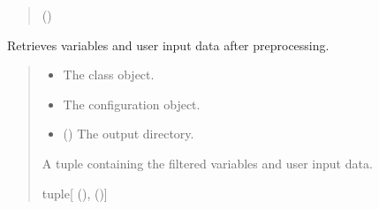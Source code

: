 \documentclass[a4paper,11pt,english,openany]{sphinxmanual}
\begin{document}
\begin{fulllineitems}
\begin{fulllineitems}
\begin{quote}
\begin{description}
\begin{description}
\end{description}


\sphinxAtStartPar
{\hyperref[\detokenize{api/spyice.parameters.user_input:src.spyice.parameters.user_input.UserInput}]{}} ()

\end{description}\end{quote}

\end{fulllineitems}


\begin{fulllineitems}
\label{\detokenize{api/spyice.preprocess.pre_process:src.spyice.preprocess.pre_process.PreProcess.get_variables}}
\pysigstartsignatures
\pysiglinewithargsret
{}
{\sphinxparamcomma {}}
{}
\pysigstopsignatures
\sphinxAtStartPar
Retrieves variables and user input data after preprocessing.
\begin{quote}\begin{description}
\begin{itemize}
\item {} 
\sphinxAtStartPar
{} \textendash{} The class object.

\item {} 
\sphinxAtStartPar
{} \textendash{} The configuration object.

\item {} 
\sphinxAtStartPar
{} () \textendash{} The output directory.

\end{itemize}

\sphinxAtStartPar
A tuple containing the filtered variables and user input data.

\sphinxAtStartPar
tuple{[}{\hyperref[\detokenize{api/spyice.preprocess.pre_process:src.spyice.preprocess.pre_process.PreprocessData}]{}} (), {\hyperref[\detokenize{api/spyice.parameters.user_input:src.spyice.parameters.user_input.UserInput}]{}} (){]}


\end{description}
\end{quote}
\end{fulllineitems}
\end{fulllineitems}
\end{document}

